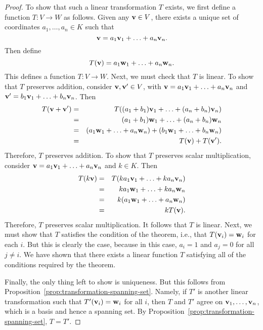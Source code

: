 \begin{proof}
  To show that such a linear transformation $T$ exists, we first
  define a function $T:V\to W$ as follows. Given any $\mbox{\bf v}\in V$,
  there exists a unique set of coordinates $a_1,\ldots,a_n\in K$ such
  that
  \begin{equation*}
    \mbox{\bf v} = a_1\mbox{\bf v}_1 + \ldots + a_n\mbox{\bf v}_n.
  \end{equation*}
  Then define
  \begin{equation*}
    T(\mbox{\bf v}) = a_1\mbox{\bf w}_1 + \ldots + a_n\mbox{\bf w}_n.
  \end{equation*}
  This defines a function $T:V\to W$.  Next, we must check that $T$ is
  linear. To show that $T$ preserves addition, consider
  $\mbox{\bf v},\mbox{\bf v}'\in V$, with
  $\mbox{\bf v} = a_1\mbox{\bf v}_1 + \ldots + a_n\mbox{\bf v}_n$ and
  $\mbox{\bf v}' = b_1\mbox{\bf v}_1 + \ldots + b_n\mbox{\bf v}_n$.  Then
  \begin{eqnarray*}
    T(\mbox{\bf v}+\mbox{\bf v}')
    &=& T((a_1+b_1)\mbox{\bf v}_1 + \ldots + (a_n+b_n)\mbox{\bf v}_n) \\
    &=& (a_1+b_1)\mbox{\bf w}_1 + \ldots + (a_n+b_n)\mbox{\bf w}_n \\
    &=& (a_1\mbox{\bf w}_1 + \ldots + a_n\mbox{\bf w}_n)
        + (b_1\mbox{\bf w}_1 + \ldots + b_n\mbox{\bf w}_n) \\
    &=& T(\mbox{\bf v}) + T(\mbox{\bf v}').
  \end{eqnarray*}    
  Therefore, $T$ preserves addition. To show that $T$ preserves scalar
  multiplication, consider $\mbox{\bf v} = a_1\mbox{\bf v}_1 + \ldots +
  a_n\mbox{\bf v}_n$ and $k\in K$. Then
  \begin{eqnarray*}
    T(k\mbox{\bf v})
    &=& T(ka_1\mbox{\bf v}_1 + \ldots + ka_n\mbox{\bf v}_n) \\
    &=& ka_1\mbox{\bf w}_1 + \ldots + ka_n\mbox{\bf w}_n \\
    &=& k(a_1\mbox{\bf w}_1 + \ldots + a_n\mbox{\bf w}_n) \\
    &=& kT(\mbox{\bf v}).
  \end{eqnarray*}    
  Therefore, $T$ preserves scalar multiplication. It follows that $T$
  is linear. Next, we must show that $T$ satisfies the condition of
  the theorem, i.e., that $T(\mbox{\bf v}_i) = \mbox{\bf w}_i$ for each $i$.
  But this is clearly the case, because in this case, $a_i=1$ and
  $a_j=0$ for all $j\neq i$. We have shown that there exists a linear
  function $T$ satisfying all of the conditions required by the
  theorem.

  Finally, the only thing left to show is uniqueness. But this follows
  from Proposition~\ref{prop:transformation-spanning-set}. Namely, if
  $T'$ is another linear transformation such that
  $T'(\mbox{\bf v}_i) = \mbox{\bf w}_i$ for all $i$, then $T$ and $T'$ agree
  on $\mbox{\bf v}_1,\ldots,\mbox{\bf v}_n$, which is a basis and hence a
  spanning set. By Proposition~\ref{prop:transformation-spanning-set},
  $T=T'$.
\end{proof}

